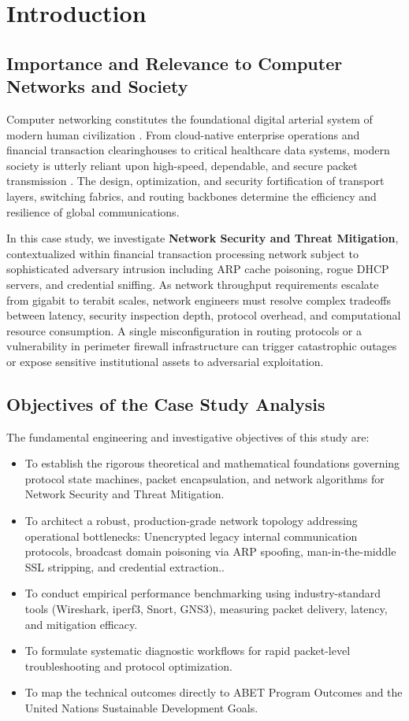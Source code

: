 \section{Introduction}

\subsection{Importance and Relevance to Computer Networks and Society}
Computer networking constitutes the foundational digital arterial system of modern human civilization \cite{kurose2021computer}. From cloud-native enterprise operations and financial transaction clearinghouses to critical healthcare data systems, modern society is utterly reliant upon high-speed, dependable, and secure packet transmission \cite{tanenbaum2021computer}. The design, optimization, and security fortification of transport layers, switching fabrics, and routing backbones determine the efficiency and resilience of global communications.

In this case study, we investigate \textbf{Network Security and Threat Mitigation}, contextualized within financial transaction processing network subject to sophisticated adversary intrusion including ARP cache poisoning, rogue DHCP servers, and credential sniffing. As network throughput requirements escalate from gigabit to terabit scales, network engineers must resolve complex tradeoffs between latency, security inspection depth, protocol overhead, and computational resource consumption. A single misconfiguration in routing protocols or a vulnerability in perimeter firewall infrastructure can trigger catastrophic outages or expose sensitive institutional assets to adversarial exploitation.

\subsection{Objectives of the Case Study Analysis}
The fundamental engineering and investigative objectives of this study are:
\begin{itemize}
  \item To establish the rigorous theoretical and mathematical foundations governing protocol state machines, packet encapsulation, and network algorithms for Network Security and Threat Mitigation.
  \item To architect a robust, production-grade network topology addressing operational bottlenecks: Unencrypted legacy internal communication protocols, broadcast domain poisoning via ARP spoofing, man-in-the-middle SSL stripping, and credential extraction..
  \item To conduct empirical performance benchmarking using industry-standard tools (Wireshark, iperf3, Snort, GNS3), measuring packet delivery, latency, and mitigation efficacy.
  \item To formulate systematic diagnostic workflows for rapid packet-level troubleshooting and protocol optimization.
  \item To map the technical outcomes directly to ABET Program Outcomes and the United Nations Sustainable Development Goals.
\end{itemize}
